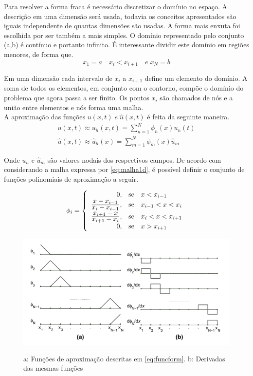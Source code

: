 Para resolver a forma fraca é necessário discretizar o domínio no espaço. A descrição em uma dimensão será usada, todavia os conceitos apresentados são iguais independente de quantas dimensões são usadas. A forma mais enxuta foi escolhida por ser também a mais simples. O domínio representado pelo conjunto (a,b) é contínuo e portanto infinito. É interessante dividir este domínio em regiões menores, de forma que.
\begin{equation} \label{eq:malha1d}
	x_1 = a \quad x_i<x_{i+1} \quad e \; x_N = b
\end{equation}

Em uma dimensão cada intervalo de $ x_i $  a $ x_{i+1} $ define um elemento do domínio. A soma de todos os elementos, em conjunto com o contorno, compõe o domínio do problema que agora passa a ser finito. Os pontos $ x_i $ são chamados de nós e a união entre elementos e nós forma uma malha. \\

A aproximação das funções $ u(x,t) \; e \; \hat{u}(x,t) $ é feita da seguinte maneira.
\begin{align} \label{eq:formafracalin}
	u(x,t) \approx u_h(x,t) = \sum_{n=1}^{N} \phi_n (x) u_n(t) \\
	\hat{u}(x,t) \approx \hat{u}_h(x) = \sum_{m=1}^{N} \phi_m (x) \hat{u}_m  
\end{align}

Onde $ u_n $ e $ \hat{u}_m $ são valores nodais dos respectivos campos.
De acordo com \cite{zienkiewicz2013} considerando a malha expressa por \ref{eq:malha1d}, é possível definir o conjunto de funções polinomiais de aproximação a seguir.

\begin{equation} \label{eq:funcform}
    \phi_i =  \left \{ \begin{array}{rcl}
         0, & \text{se} & x < x_{i-1} \\
        \frac{\displaystyle x - x_{i-1}}{\displaystyle x_i - x_{i-1}}, &  \text{se} & x_{i-1} < x < x_{i} \\
        \frac{\displaystyle x_{i+1} - x}{\displaystyle x_{i+1} - x_{i}}, &  \text{se} & x_i < x < x_{i+1} \\
         0, & \text{se} & x > x_{i+1}
    \end{array} \right.
\end{equation}

\begin{figure}[h] %
    \centering
    \caption{ a: Funções de aproximação descritas em \ref{eq:funcform}. b: Derivadas das mesmas funções }
    \includegraphics[width=0.8\linewidth]{images/funcform.png}
    \label{fig:funcform}
\end{figure}

